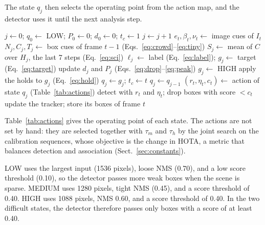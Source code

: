 \documentclass[pdflatex,sn-mathphys-num,iicol]{sn-jnl}
\makeatletter
\def\subsectionfont{\reset@font\fontfamily{\rmdefault}\fontsize{10bp}{12bp}\bfseries\selectfont\raggedright\boldmath}
\renewcommand\subsection{\@startsection{subsection}{2}{\z@}{-7pt \@plus -2pt \@minus -2pt}{3pt}{\subsectionfont}}
\makeatother
\begin{document}
The state $q_j$ then selects the operating point from the action map, and the
detector uses it until the next analysis step.

\begin{algorithm}[t]
\caption{AC-MOT controller for one video}\label{alg:controller}
\begin{algorithmic}[1]
\State $j\gets0$; $q_0\gets$ LOW; $P_0\gets0$; $d_0\gets0$; $t_c\gets1$
    \State $j\gets j+1$
    \State $e_t,\beta_t,\nu_t\gets$ image cues of $I_t$
    \State $N_j,C_j,T_j\gets$ box cues of frame $t-1$ (Eqs.~\ref{eq:crowd}--\ref{eq:tiny})
    \State $S_j\gets$ mean of $C$ over $H_j$, the last 7 steps (Eq.~\ref{eq:sci})
    \State $\ell_j\gets$ label (Eq.~\ref{eq:label}); $g_j\gets$ target (Eq.~\ref{eq:target})
    \State update $d_j$ and $P_j$ (Eqs.~\ref{eq:drop}--\ref{eq:peak})
     $g_j\gets$ HIGH
    \EndIf
    \State apply the holds to $g_j$ (Eq.~\ref{eq:hold})
      \State $q_j\gets g_j$; $t_c\gets t$
    \Else
      \State $q_j\gets q_{j-1}$
    \EndIf
  \EndIf
  \State $(r_t,\eta_t,c_t)\gets$ action of state $q_j$ (Table~\ref{tab:actions})
  \State detect with $r_t$ and $\eta_t$; drop boxes with score $<c_t$
  \State update the tracker; store its boxes of frame $t$
\EndFor
\end{algorithmic}
\end{algorithm}

\subsection{Action map}\label{sec:actions}
Table~\ref{tab:actions} gives the operating point of each state. The actions
are not set by hand: they are selected together with $\tau_m$ and $\tau_h$
by the joint search on the calibration sequences, whose objective is the
change in HOTA, a metric that balances detection and association
(Sect.~\ref{sec:constants}).

LOW uses the largest input (1536 pixels), loose NMS (0.70), and a low score
threshold (0.10), so the detector passes more weak boxes when the scene is
sparse. MEDIUM uses 1280 pixels, tight NMS (0.45), and a score threshold of
0.40. HIGH uses 1088 pixels, NMS 0.60, and a score threshold of 0.40. In the
two difficult states, the detector therefore passes only boxes with a score of
at least 0.40.
\end{document}
